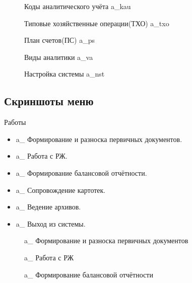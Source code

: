 \begin{figure}[!htb]
    \centering
    \caption{Коды аналитического учёта \gpiFIO\/a\_kau}
\end{figure}

\begin{figure}[!htb]
    \centering
    \caption{Типовые хозяйственные операции(ТХО) \gpiFIO\/a\_txo}
\end{figure}

\begin{figure}[!htb]
    \centering
    \caption{План счетов(ПС) \gpiFIO\/a\_ps}
\end{figure}

\begin{figure}[!htb]
    \centering
    \caption{Виды аналитики \gpiFIO\/a\_va}
\end{figure}

\begin{figure}[!htb]
    \centering
    \caption{Настройка системы \gpiFIO\/a\_nst}
\end{figure}

\newpage

\subsection{Скриншоты меню}

Работы

\begin{itemize}
    \item \gpiFIO\/a\_ Формирование и разноска первичных документов.
    \item \gpiFIO\/a\_ Работа с РЖ.
    \item \gpiFIO\/a\_ Формирование балансовой отчётности.
    \item \gpiFIO\/a\_ Сопровождение картотек.
    \item \gpiFIO\/a\_ Ведение архивов.
    \item \gpiFIO\/a\_ Выход из системы.
\end{itemize}

\begin{figure}[!htb]
    \centering
    \caption{\gpiFIO\/a\_ Формирование и разноска первичных документов}
\end{figure}

\begin{figure}[!htb]
    \centering
    \caption{\gpiFIO\/a\_ Работа с РЖ}
\end{figure}

\begin{figure}[!htb]
    \centering
    \caption{\gpiFIO\/a\_ Формирование балансовой отчётности}
\end{figure}

